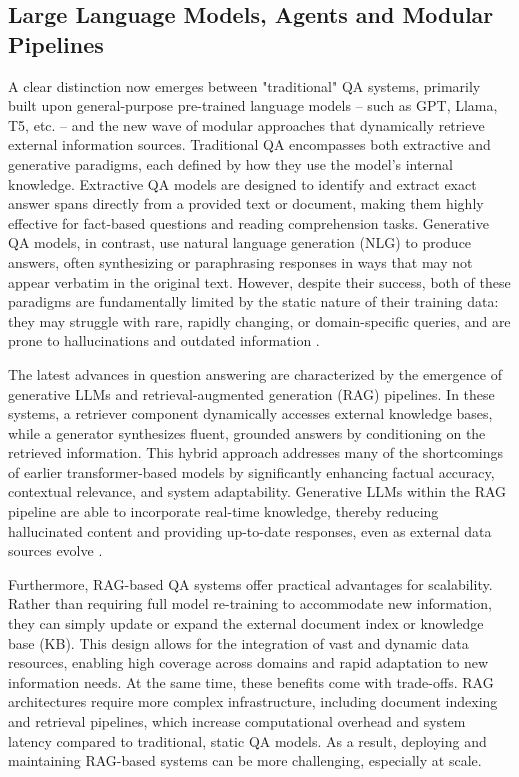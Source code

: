 \begin{spacing}{1.5}
\section{Large Language Models, Agents and Modular Pipelines}\label{sec:llm-agents}
A clear distinction now emerges between "traditional" QA systems, primarily built upon general-purpose pre-trained language models -- such as GPT, Llama, T5, etc. -- and the new wave of modular approaches that dynamically retrieve external information sources. Traditional QA encompasses both extractive and generative paradigms, each defined by how they use the model’s internal knowledge. Extractive QA models are designed to identify and extract exact answer spans directly from a provided text or document, making them highly effective for fact-based questions and reading comprehension tasks. Generative QA models, in contrast, use natural language generation (NLG) to produce answers, often synthesizing or paraphrasing responses in ways that may not appear verbatim in the original text. However, despite their success, both of these paradigms are fundamentally limited by the static nature of their training data: they may struggle with rare, rapidly changing, or domain-specific queries, and are prone to hallucinations and outdated information \citep{farea_understanding_2025}.

The latest advances in question answering are characterized by the emergence of generative LLMs and retrieval-augmented generation (RAG) pipelines. In these systems, a retriever component dynamically accesses external knowledge bases, while a generator synthesizes fluent, grounded answers by conditioning on the retrieved information. This hybrid approach addresses many of the shortcomings of earlier transformer-based models by significantly enhancing factual accuracy, contextual relevance, and system adaptability. Generative LLMs within the RAG pipeline are able to incorporate real-time knowledge, thereby reducing hallucinated content and providing up-to-date responses, even as external data sources evolve \citep{yue_survey_2025,lewis_retrieval-augmented_2020}. 

Furthermore, RAG-based QA systems offer practical advantages for scalability. Rather than requiring full model re-training to accommodate new information, they can simply update or expand the external document index or knowledge base (KB). This design allows for the integration of vast and dynamic data resources, enabling high coverage across domains and rapid adaptation to new information needs. At the same time, these benefits come with trade-offs. RAG architectures require more complex infrastructure, including document indexing and retrieval pipelines, which increase computational overhead and system latency compared to traditional, static QA models. As a result, deploying and maintaining RAG-based systems can be more challenging, especially at scale.


\end{spacing}
